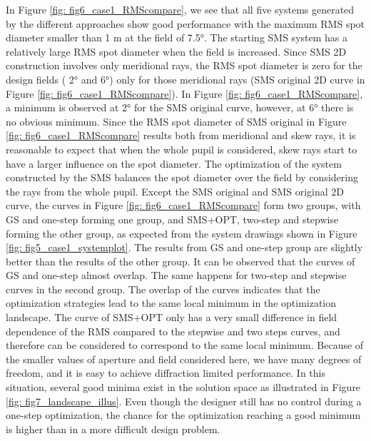 In Figure \ref{fig: fig6_case1_RMScompare}, we see that all five systems generated by the different approaches show good performance with the maximum RMS spot diameter smaller than 1 \textmu m at the field of 7.5°. The starting SMS system has a relatively large RMS spot diameter when the field is increased. Since SMS 2D construction involves only meridional rays, the RMS spot diameter is zero for the design fields ( 2° and 6°) only for those meridional rays (SMS original 2D curve in Figure \ref{fig: fig6_case1_RMScompare}). In Figure \ref{fig: fig6_case1_RMScompare}, a minimum is observed at 2° for the SMS original curve, however, at 6° there is no obvious minimum. Since the RMS spot diameter of SMS original in Figure \ref{fig: fig6_case1_RMScompare} results both from meridional and skew rays, it is reasonable to expect that when the whole pupil is considered, skew rays start to have a larger influence on the spot diameter. The optimization of the system constructed by the SMS balances the spot diameter over the field by considering the rays from the whole pupil. Except the SMS original and SMS original 2D curve, the curves in Figure \ref{fig: fig6_case1_RMScompare} form two groups, with GS and one-step forming one group, and SMS+OPT, two-step and stepwise forming the other group, as expected from the system drawings shown in Figure \ref{fig: fig5_case1_systemplot}. The results from GS and one-step group are slightly better than the results of the other group.  It can be observed that the curves of GS and one-step almost overlap. The same happens for two-step and stepwise curves in the second group. The overlap of the curves indicates that the optimization strategies lead to the same local minimum in the optimization landscape. The curve of SMS+OPT only has a very small difference in field dependence of the RMS compared to the stepwise and two steps curves, and therefore can be considered to correspond to the same local minimum. Because of the smaller values of aperture and field considered here, we have many degrees of freedom, and it is easy to achieve diffraction limited performance. In this situation, several good minima exist in the solution space as illustrated in Figure \ref{fig: fig7_landscape_illus}. Even though the designer still has no control during a one-step optimization, the chance for the optimization reaching a good minimum is higher than in a more difficult design problem.

